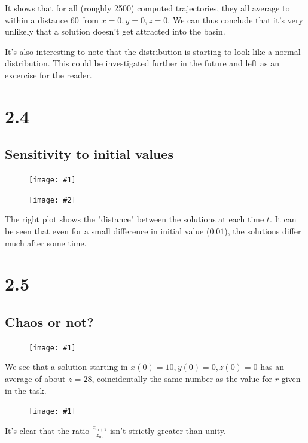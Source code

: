 \documentclass[11pt]{article}
\newcommand{\doublefigure}[2]{
\begin{figure}[H]
  \centering
  \begin{minipage}{0.45\textwidth}
    \centering
    \texttt{[image: \#1]}
  \end{minipage}
  \begin{minipage}{0.45\textwidth}
    \centering
    \texttt{[image: \#2]}
  \end{minipage}
\end{figure}
}
\newcommand{\singlefigure}[1]{
\begin{figure}[H]
  \centering
  \begin{minipage}{0.4\textwidth}
    \centering
    \texttt{[image: \#1]}
  \end{minipage}
\end{figure}
}
\begin{document}
It shows that for all (roughly 2500) computed trajectories, they all average to within a distance 60 from $x = 0, y = 0, z = 0$.
We can thus conclude that it's very unlikely that a solution doesn't get attracted into the basin.

It's also interesting to note that the distribution is starting to look like a normal distribution. This could be investigated further in the future and left as an excercise for the reader. 
\section*{2.4}

\subsection*{Sensitivity to initial values}
\doublefigure{./plots/2_4/solution.png}{./plots/2_4/difference.png}

The right plot shows the "distance" between the solutions at each time $t$.
It can be seen that even for a small difference in initial value ($0.01$), the solutions differ much after some time.

\newpage


\section*{2.5}

\begin{multicols}{2}
\subsection*{Chaos or not?}
\singlefigure{./plots/2_5/study.png}
We see that a solution starting in $x(0) = 10, y(0) = 0, z(0) = 0$ has an average of about $z = 28$, coincidentally the same number as the value for $r$ given in the task.
 
\columnbreak
\singlefigure{./plots/2_5/peaks.png}
It's clear that the ratio $\frac{z_{m+1}}{z_m}$ isn't strictly greater than unity.
\end{multicols}
\end{document}
